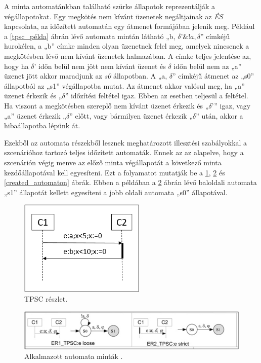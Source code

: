 A minta automatánkban található szürke állapotok reprezentálják a végállapotokat.
Egy megkötés nem kívánt üzenetek negáltjainak az \textit{ÉS} kapcsolata, az időzített automatán egy átmenet formájában jelenik meg.
Például a \ref{tpsc_példa} ábrán lévő automata mintán látható „b, $\delta ’\&!a, \delta$” címkéjű hurokélen, a „b” címke minden olyan üzenetnek felel meg, amelyek nincsenek a megkötésben lévő nem kívánt üzenetek halmazában.
A címke teljes jelentése az, hogy ha $\delta$’ időn belül nem jött nem kívánt üzenet és $\delta$ időn belül nem az „a” üzenet jött akkor maradjunk az \textit{s0} állapotban.
A „a, $\delta$” címkéjű átmenet az „s0” állapotból az „s1” végállapotba mutat.
Az átmenet akkor valósul meg, ha „a” üzenet érkezik és „$\delta$” időzítési feltétel igaz.
Ebben az esetben teljesül a feltétel.
Ha viszont a megkötésben szereplő nem kívánt üzenet érkezik és „$\delta$’” igaz, vagy „a” üzenet érkezik „$\delta$” előtt, vagy bármilyen üzenet érkezik „$\delta$” után, akkor a hibaállapotba lépünk át.

Ezekből az automata részekből lesznek meghatározott illesztési szabályokkal a szcenárióhoz tartozó teljes időzített automaták.
Ennek az az alapelve, hogy a szcenárión végig menve az előző minta végállapotát a következő minta kezdőállapotával kell egyesíteni.
Ezt a folyamatot mutatják be a \ref{tpsc_subset}, \ref{tpsc_used_patterns} és \ref{created_automaton} ábrák.
Ebben a példában a \ref{tpsc_used_patterns} ábrán lévő baloldali automata „s1” állapotát kellett egyesíteni a jobb oldali automata „s0” állapotával.

\begin{figure}[!ht]
    \centering
    \includegraphics[width=60mm, keepaspectratio]{figures/7abra.png}
    \caption{TPSC részlet.}
    \label{tpsc_subset}
\end{figure}

\begin{figure}[!ht]
    \centering
    \includegraphics[width=150mm, keepaspectratio]{figures/8abra.png}
    \caption{Alkalmazott automata minták \cite{TPSC1}.}
    \label{tpsc_used_patterns}
\end{figure}

